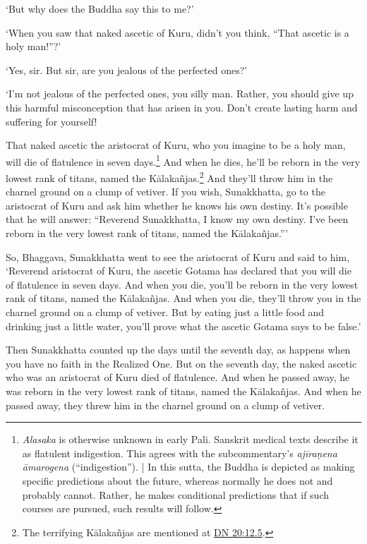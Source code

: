\documentclass[12pt,openany]{book}%
\begin{document}
‘But why does the Buddha say this to me?’ 

‘When you saw that naked ascetic of Kuru, didn’t you think, “That ascetic is a holy man!”?’ 

‘Yes, sir. But sir, are you jealous of the perfected ones?’ 

‘I’m not jealous of the perfected ones, you silly man. Rather, you should give up this harmful misconception that has arisen in you. Don’t create lasting harm and suffering for yourself! 

That naked ascetic the aristocrat of Kuru, who you imagine to be a holy man, will die of flatulence in seven days.\footnote{\textit{Alasaka} is otherwise unknown in early Pali. Sanskrit medical texts describe it as flatulent indigestion. This agrees with the subcommentary’s \textit{\textsanskrit{ajīraṇena} \textsanskrit{āmarogena}} (“indigestion”). | In this sutta, the Buddha is depicted as making specific predictions about the future, whereas normally he does not and probably cannot. Rather, he makes conditional predictions that if such courses are pursued, such results will follow. } And when he dies, he’ll be reborn in the very lowest rank of titans, named the \textsanskrit{Kālakañjas}.\footnote{The terrifying \textsanskrit{Kālakañjas} are mentioned at \href{https://suttacentral.net/dn20/en/sujato\#12.5}{DN 20:12.5}. } And they’ll throw him in the charnel ground on a clump of vetiver. If you wish, Sunakkhatta, go to the aristocrat of Kuru and ask him whether he knows his own destiny. It’s possible that he will answer: “Reverend Sunakkhatta, I know my own destiny. I’ve been reborn in the very lowest rank of titans, named the \textsanskrit{Kālakañjas}.”’ 

So, Bhaggava, Sunakkhatta went to see the aristocrat of Kuru and said to him, ‘Reverend aristocrat of Kuru, the ascetic Gotama has declared that you will die of flatulence in seven days. And when you die, you’ll be reborn in the very lowest rank of titans, named the \textsanskrit{Kālakañjas}. And when you die, they’ll throw you in the charnel ground on a clump of vetiver. But by eating just a little food and drinking just a little water, you’ll prove what the ascetic Gotama says to be false.’ 

Then Sunakkhatta counted up the days until the seventh day, as happens when you have no faith in the Realized One. But on the seventh day, the naked ascetic who was an aristocrat of Kuru died of flatulence. And when he passed away, he was reborn in the very lowest rank of titans, named the \textsanskrit{Kālakañjas}. And when he passed away, they threw him in the charnel ground on a clump of vetiver. 
\end{document}
